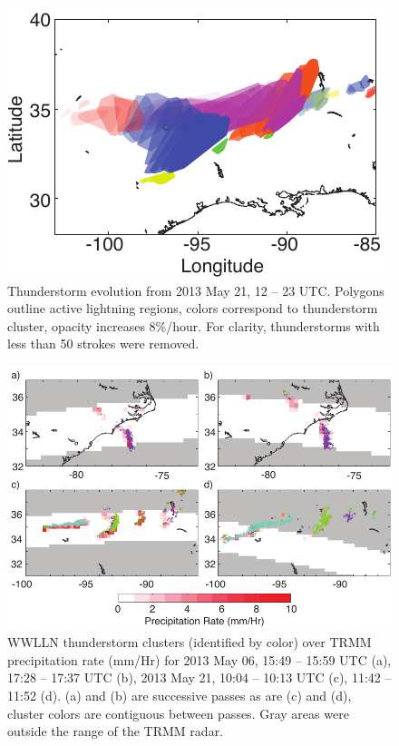  \begin{figure}[ht!]
    \centering
    \includegraphics[scale=1]{GEC/Figures/evolution.pdf} 
    \caption{Thunderstorm evolution from 2013 May 21, 12 -- 23 UTC.
    		 Polygons outline active lightning regions, colors correspond to thunderstorm cluster, opacity increases 8\%/hour.
		 For clarity, thunderstorms with less than 50 strokes were removed.}
    \label{evolution}
 \end{figure}

 \begin{figure}[ht!]
    \centering
    \includegraphics[scale=1]{GEC/Figures/overpass.pdf} 
    \caption{WWLLN thunderstorm clusters (identified by color) over TRMM precipitation rate (mm/Hr) for 2013 May 06, 15:49 -- 15:59 UTC (a), 17:28 -- 17:37 UTC (b), 2013 May 21, 10:04 -- 10:13 UTC (c), 11:42 -- 11:52 (d).
    		(a) and (b) are successive passes as are (c) and (d), cluster colors are contiguous between passes.
		Gray areas were outside the range of the TRMM radar.}
    \label{overpass}
 \end{figure}
 
